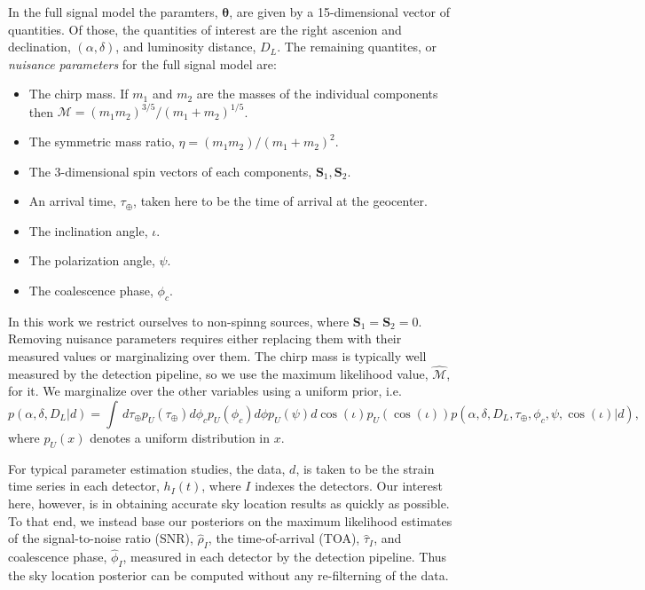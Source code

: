 \documentclass{iopart}
\begin{document}
In the full signal model the paramters, $\boldsymbol\theta$, are given by a 15-dimensional vector of quantities.  Of those, the quantities of interest are the right ascenion and declination, $(\alpha,\delta)$, and luminosity distance, $D_L$.  The remaining quantites, or {\it nuisance parameters} for the full signal model are:
\begin{itemize}
\item The chirp mass.  If $m_1$ and $m_2$ are the masses of the individual components then $\mathcal{M}=(m_1m_2)^{3/5}/(m_1+m_2)^{1/5}$.
\item The symmetric mass ratio, $\eta=(m_1m_2)/(m_1+m_2)^2$.
\item The 3-dimensional spin vectors of each components, $\mathbf{S}_1,\mathbf{S}_2$.
\item An arrival time, $\tau_\oplus$, taken here to be the time of arrival at the geocenter.
\item The inclination angle, $\iota$.
\item The polarization angle, $\psi$.
\item The coalescence phase, $\phi_c$.
\end{itemize}
In this work we restrict ourselves to non-spinng sources, where $\mathbf{S}_1=\mathbf{S}_2=0$.  Removing nuisance parameters requires either replacing them with their measured values or marginalizing over them.  The chirp mass is typically well measured by the detection pipeline, so we use the maximum likelihood value, $\hat{\mathcal{M}}$, for it.  We marginalize over the other variables using a uniform prior, i.e.
\begin{equation}
p(\alpha,\delta,D_L|d) = \int\, d\tau_\oplus p_U(\tau_\oplus) d\phi_c p_U(\phi_c) d\phi p_U(\psi)  d\cos(\iota) p_U(\cos(\iota)) p(\alpha,\delta,D_L,\tau_\oplus,\phi_c,\psi,\cos(\iota)|d),
\end{equation}
where $p_U(x)$ denotes a uniform distribution in $x$.

For typical parameter estimation studies, the data, $d$, is taken to be the strain time series in each detector, $h_I(t)$, where $I$ indexes the detectors.  Our interest here, however, is in obtaining accurate sky location results as quickly as possible.  To that end, we instead base our posteriors on the maximum likelihood estimates of the signal-to-noise ratio (SNR), $\hat{\rho}_I$, the time-of-arrival (TOA), $\hat{\tau}_I$, and coalescence phase, $\hat{\phi}_I$, measured in each detector by the detection pipeline.  Thus the sky location posterior can be computed without any re-filterning of the data.
\end{document}
